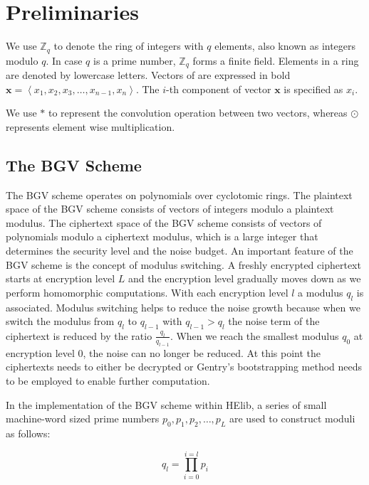 \documentclass[lettersize,journal]{IEEEtran}
\begin{document}
\section{Preliminaries}
We use $\mathbb{Z}_q$ to denote the ring of integers with $q$ elements, also known as integers modulo $q$. In case $q$ is a prime number, $\mathbb{Z}_q$ forms a finite field. Elements in a ring are denoted by lowercase letters. Vectors of are expressed in bold $\mathbf{x} = \left \langle x_1, x_2, x_3, \ldots, x_{n-1}, x_n  \right \rangle$. The $i$-th component of vector $\mathbf{x}$ is specified as $x_i$. 

We use $\ast$ to represent the convolution operation between two vectors, whereas $\odot$ represents element wise multiplication. 

\subsection{The BGV Scheme}
The BGV scheme operates on polynomials over cyclotomic rings. The plaintext space of the BGV scheme consists of vectors of integers modulo a plaintext modulus. The ciphertext space of the BGV scheme consists of vectors of polynomials modulo a ciphertext modulus, which is a large integer that determines the security level and the noise budget. An important feature of the BGV scheme is the concept of modulus switching. A freshly encrypted ciphertext starts at encryption level $L$ and the encryption level gradually moves down as we perform homomorphic computations. With each encryption level $l$ a modulus $q_l$ is associated. Modulus switching helps to reduce the noise growth because when we switch the modulus from $q_l$ to $q_{l-1}$ with $q_{l-1} > q_l$ the noise term of the ciphertext is reduced by the ratio $\frac{q_l}{q_{l-1}}$. When we reach the smallest modulus $q_0$ at encryption level 0, the noise can no longer be reduced. At this point the ciphertexts needs to either be decrypted or Gentry's bootstrapping method\cite{10.1145/1536414.1536440} needs to be employed to enable further computation.

In the implementation of the BGV scheme within HElib, a series of small machine-word sized prime numbers ${p_0, p_1, p_2, \ldots, p_L}$ are used to construct moduli as follows:\cite{cryptoeprint:2014/873} 

\begin{equation}
q_l = \prod_{i=0}^{i=l} p_i
\end{equation}
\end{document}
